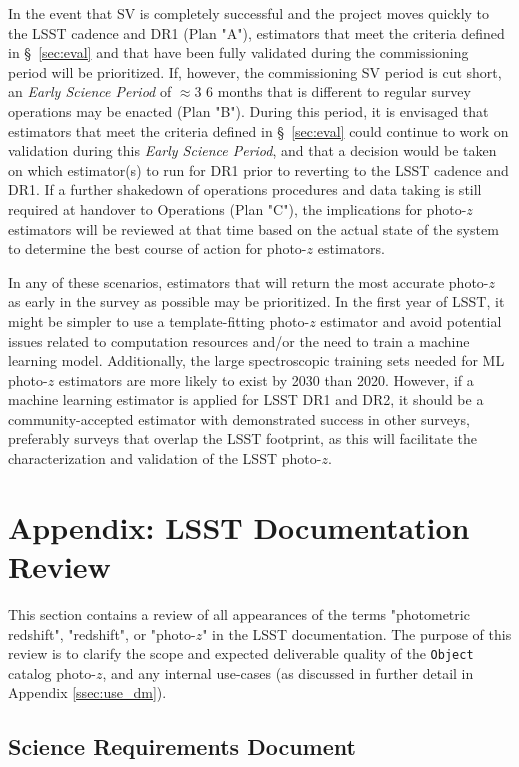 \documentclass[DM,lsstdraft,toc]{lsstdoc}
\begin{document}
In the event that SV is completely successful and the project moves quickly to the LSST cadence and DR1 (Plan "A"), estimators that  meet the criteria defined in \S~\ref{sec:eval} and that have been fully validated during the commissioning period will be prioritized. 
If, however, the commissioning SV period is cut short, an {\it Early Science Period} of $\approx$3\,\textendash\,6 months that is different to regular survey operations may be enacted (Plan "B").
During this period, it is envisaged that estimators that meet the criteria defined in \S~\ref{sec:eval} could continue to work on validation during this {\it Early Science Period}, and that a decision would be taken on which estimator(s) to run for DR1 prior to reverting to the LSST cadence and DR1. 
If a further shakedown of operations procedures and data taking is still required at handover to Operations (Plan "C"), the implications for photo-$z$ estimators will be reviewed at that time based on the actual state of the system to determine the best course of action for photo-$z$ estimators. 

In any of these scenarios,  estimators that will return the most accurate photo-$z$ as early in the survey as possible may be prioritized.
In the first year of LSST, it might be simpler to use a template-fitting photo-$z$ estimator and avoid potential issues related to computation resources and/or the need to train a machine learning model.
Additionally, the large spectroscopic training sets needed for ML photo-$z$ estimators are more likely to exist by 2030 than 2020.
However, if a machine learning estimator is applied for LSST DR1 and DR2, it should be a community-accepted estimator with demonstrated success in other surveys, preferably surveys that overlap the LSST footprint, as this will facilitate the characterization and validation of the LSST photo-$z$.

\section{Appendix: LSST Documentation Review}\label{sec:docs}

This section contains a review of all appearances of the terms "photometric redshift", "redshift", or "photo-$z$" in the LSST documentation.
The purpose of this review is to clarify the scope and expected deliverable quality of the {\tt Object} catalog photo-$z$, and any internal use-cases (as discussed in further detail in Appendix \ref{ssec:use_dm}).

\subsection{Science Requirements Document}\label{ssec:docs_srd}
\end{document}
